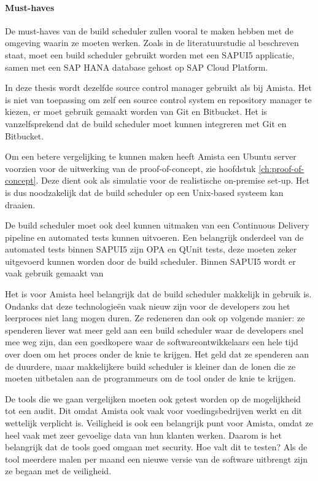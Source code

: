             \paragraph{Must-haves}
            De must-haves van de build scheduler zullen vooral te maken hebben met de omgeving waarin ze moeten werken. Zoals in de literatuurstudie al beschreven staat, moet een build scheduler gebruikt worden met een SAPUI5 applicatie, samen met een SAP HANA database gehost op SAP Cloud Platform.
            
            In deze thesis wordt dezelfde source control manager gebruikt als bij Amista. Het is niet van toepassing om zelf een source control system en repository manager te kiezen, er moet gebruik gemaakt worden van Git en Bitbucket. Het is vanzelfsprekend dat de build scheduler moet kunnen integreren met Git en Bitbucket.

            Om een betere vergelijking te kunnen maken heeft Amista een Ubuntu server voorzien voor de uitwerking van de proof-of-concept, zie hoofdstuk \ref{ch:proof-of-concept}. Deze dient ook als simulatie voor de realistische on-premise set-up. Het is dus noodzakelijk dat de build scheduler op een Unix-based systeem kan draaien.
            
            De build scheduler moet ook deel kunnen uitmaken van een Continuous Delivery pipeline en automated tests kunnen uitvoeren. Een belangrijk onderdeel van de automated tests binnen SAPUI5 zijn OPA en QUnit  tests, deze moeten zeker uitgevoerd kunnen worden door de build scheduler.
            Binnen SAPUI5 wordt er vaak gebruik gemaakt van %
            
            Het is voor Amista heel belangrijk dat de build scheduler makkelijk in gebruik is. Ondanks dat deze technologieën vaak nieuw zijn voor de developers zou het leerproces niet lang mogen duren. Ze redeneren dan ook op volgende manier: ze spenderen liever wat meer geld aan een build scheduler waar de developers snel mee weg zijn, dan een goedkopere waar de softwareontwikkelaars een hele tijd over doen om het proces onder de knie te krijgen. Het geld dat ze spenderen aan de duurdere, maar makkelijkere build scheduler is kleiner dan de lonen die ze moeten uitbetalen aan de programmeurs om de tool onder de knie te krijgen.
            
            De tools die we gaan vergelijken moeten ook getest worden op de mogelijkheid tot een audit. Dit omdat Amista ook vaak voor voedingsbedrijven werkt en dit wettelijk verplicht is.
            Veiligheid is ook een belangrijk punt voor Amista, omdat ze heel vaak met zeer gevoelige data van hun klanten werken. Daarom is het belangrijk dat de tools goed omgaan met security. Hoe valt dit te testen? Als de tool meerdere malen per maand een nieuwe versie van de software uitbrengt zijn ze begaan met de veiligheid.
            
